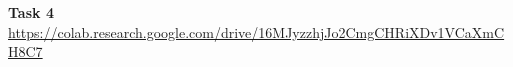 {\large \bf Task 4}\\
\url{https://colab.research.google.com/drive/16MJyzzhjJo2CmgCHRiXDv1VCaXmCH8C7}
